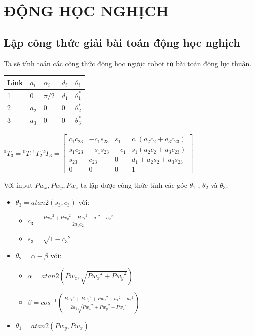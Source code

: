 \section{ĐỘNG HỌC NGHỊCH}
\subsection{Lập công thức giải bài toán động học nghịch}
Ta sẽ tính toán các công thức động học ngược robot từ bài toán động lực thuận.
\begin{center}
	\begin{tabular}{|m{2cm}|m{2cm}|m{2cm}|m{2cm}|m{2cm}|} 
		\hline
		Link & $a_{i}$ & $\alpha_{i}$ & $d_{i}$ & $\theta_{i}$\\ [0.5ex] 
		\hline
		1 & 0 & $\pi/2$ & $d_{1}$ & $\theta_{1}^{*}$\\ 
		\hline
		2 & $a_{2}$ & 0 & 0 & $\theta_{2}^{*}$\\
		\hline
		3 & $a_{3}$ & 0 & 0 & $\theta_{3}^{*}$\\ [0.5ex] 
		\hline
	\end{tabular}
\end{center}

\begin{center}
$^{0}T_{3} = {^{0}T_{1}} {^{1}T_{2}} {^{2}T_{3}} = \begin{bmatrix}
	c_{1}c_{23} & -c_{1}s_{23} & s_{1} & c_{1}(a_{2}c_{2}+a_{3}c_{23})\\
	s_{1}c_{23} & -s_{1}s_{23} & -c_{1} & s_{1}(a_{2}c_{2}+a_{3}c_{23})\\
	s_{23} & c_{23} & 0 & d_{1}+ a_{2}s_{2}+a_{3}s_{23}\\
	0 & 0 & 0 & 1
\end{bmatrix}$
\end{center}

Với input $Pw_x, Pw_y, Pw_z$ ta lập được công thức tính các góc $\theta_{1}$ , $\theta_{2}$ và $\theta_{3}$:
\begin{itemize}
	\item $\theta_3 = atan2(s_3, c_3) $ với:
	\begin{itemize} 
		\item $c_3 =\frac{{Pw_x}^2+{Pw_y}^2+{Pw_z}^2-{a_1}^2-{a_2}^2}{2a_1a_2}$  
		\item $s_3=\sqrt{1-{c_3}^2}$
	\end{itemize}
	\item $\theta_2 = \alpha - \beta$ với:
	\begin{itemize}
		\item $\alpha = atan2(Pw_z, \sqrt{{Pw_x}^2+{Pw_y}^2})$  
		\item $\beta = cos^{-1}(\frac{{Pw_x}^2+{Pw_y}^2+{Pw_z}^2+{a_1}^2-{a_2}^2}{2a_1\sqrt{{Pw_x}^2+{Pw_y}^2+{Pw_z}^2}})$
	\end{itemize}
	\item $\theta_1 = atan2(Pw_y, Pw_x)$
\end{itemize}

